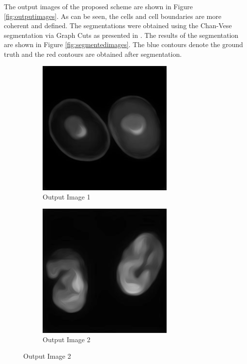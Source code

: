 \documentclass[a4paper,11pt]{ijamas}
\begin{document}
The output images of the proposed scheme are shown in Figure \ref{fig:outputimages}.
As can be seen, the cells and cell boundaries are more coherent and defined. The segmentations were obtained using the Chan-Vese segmentation via Graph Cuts as presented in \cite{zehiry:2007}. The results of the segmentation are shown in Figure \ref{fig:segmentedimages}. The blue contours denote the ground truth and the red contours are obtained after segmentation.


\begin{figure}[!h]
\centering
\begin{subfigure}{.48\textwidth}
  \centering
  \includegraphics[width=0.80\columnwidth]{./figs/1diffused.jpg}
  \caption{Output Image 1}
  \label{fig:outputimage_1}
\end{subfigure}%
\begin{subfigure}{.48\textwidth}
  \centering
  \includegraphics[width=0.80\columnwidth]{./figs/3diffused.jpg}
 \caption{Output Image 2}
  \label{fig:outputimage_3}
\end{subfigure}%



\end{figure}
\end{document}
